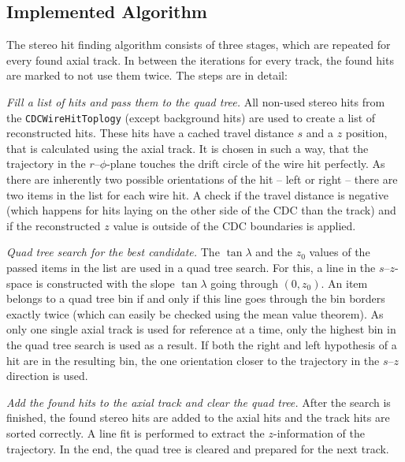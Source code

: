 \subsection{Implemented Algorithm}

The stereo hit finding algorithm consists of three stages, which are repeated for every found axial track. In between the iterations for every track, the found hits are marked to not use them twice. The steps are in detail:
\begin{zlist}
  \item \textit{Fill a list of hits and pass them to the quad tree.} All non-used stereo hits from the \texttt{CDCWireHitToplogy} (except background hits) are used to create a list of reconstructed hits. These hits have a cached travel distance $s$ and a $z$ position, that is calculated using the axial track. It is chosen in such a way, that the trajectory in the $r$--$\phi$-plane touches the drift circle of the wire hit perfectly. As there are inherently two possible orientations of the hit -- left or right -- there are two items in the list for each wire hit. A check if the travel distance is negative (which happens for hits laying on the other side of the CDC than the track) and if the reconstructed $z$ value is outside of the CDC boundaries is applied. 
  \item \textit{Quad tree search for the best candidate.} The $\tan \lambda$ and the $z_0$ values of the passed items in the list are used in a quad tree search. For this, a line in the $s$--$z$-space is constructed with the slope $\tan \lambda$ going through $(0, z_0)$. An item belongs to a quad tree bin if and only if this line goes through the bin borders exactly twice (which can easily be checked using the mean value theorem). As only one single axial track is used for reference at a time, only the highest bin in the quad tree search is used as a result. If both the right and left hypothesis of a hit are in the resulting bin, the one orientation closer to the trajectory in the $s$--$z$ direction is used.
  \item \textit{Add the found hits to the axial track and clear the quad tree.} After the search is finished, the found stereo hits are added to the axial hits and the track hits are sorted correctly. A line fit is performed to extract the $z$-information of the trajectory. In the end, the quad tree is cleared and prepared for the next track.
\end{zlist}



